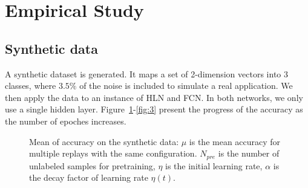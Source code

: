 \documentclass[3p,times,procedia]{elsarticle}
\begin{document}
\section{Empirical Study}
\subsection{Synthetic data}
A synthetic dataset is generated. 
It maps a set of
2-dimension vectors into 3 classes, 
where
$3.5\%$ of the noise is included
to simulate a real application.
We then apply the data to an instance
of HLN and FCN.
In both networks, we only use a single
hidden layer.
Figure~\ref{fig:2}-\ref{fig:3} 
present the progress of the accuracy 
as the number of epoches increases.

\begin{figure}[h]
	\centering
	\hspace{-8mm}
	\hspace{-8mm}
	\caption{
		Mean of 
		accuracy on the synthetic data:
		$\mu$ is the mean accuracy for
		multiple replays with the same
		configuration.
		$N_{pre}$ is the number of
		unlabeled samples
		for pretraining, $\eta$
		is the initial learning rate,
		$\alpha$ is the decay factor of
		learning rate $\eta(t)$.
		}
	\label{fig:2}
\end{figure}
\end{document}
